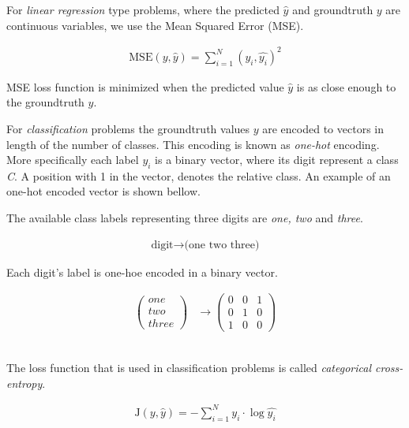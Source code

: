 For \textit{linear regression} type problems, where the predicted $\hat{y}$ and groundtruth $y$ are continuous variables, we use the Mean Squared Error (MSE).

\begin{ceqn}
\label{c3:mse_eq}
\begin{align}
  \text{MSE}(y, \hat{y}) = \sum_{i=1}^{N} (y_i, \hat{y_i})^2
\end{align}
\end{ceqn}

MSE loss function is minimized when the predicted value $\hat{y}$ is as close enough to the groundtruth $y$.

For \textit{classification} problems the groundtruth values $y$ are encoded to vectors in length of the number of classes. This encoding is known as \textit{one-hot} encoding. More specifically each label $y_i$ is a binary vector, where its digit represent a class \textit{C}. A position with 1 in the vector, denotes the relative class. An example of an one-hot encoded vector is shown bellow.

The available class labels representing three digits are \textit{one, two} and \textit{three}.
\begin{ceqn}
\label{c3:one_hot_example}
\begin{align*}
  \text{digit} \rightarrow \text{(one two three)}
\end{align*}
\end{ceqn}

Each digit's label is one-hoe encoded in a binary vector.

\begin{ceqn}
\begin{align*}
        \begin{pmatrix} one \\ two \\ three \end{pmatrix} & \rightarrow \begin{pmatrix} 0 & 0 & 1 \\ 0 & 1 & 0 \\ 1 & 0 & 0 \end{pmatrix}
\end{align*}  
\end{ceqn}
\\

The loss function that is used in classification problems is called \textit{categorical cross-entropy}.

\begin{ceqn}
\begin{align}
  \text{J}(y, \hat{y}) = -\sum_{i=1}^{N} y_i \cdot \log \hat{y_i}
\end{align}  
\end{ceqn}
\\

